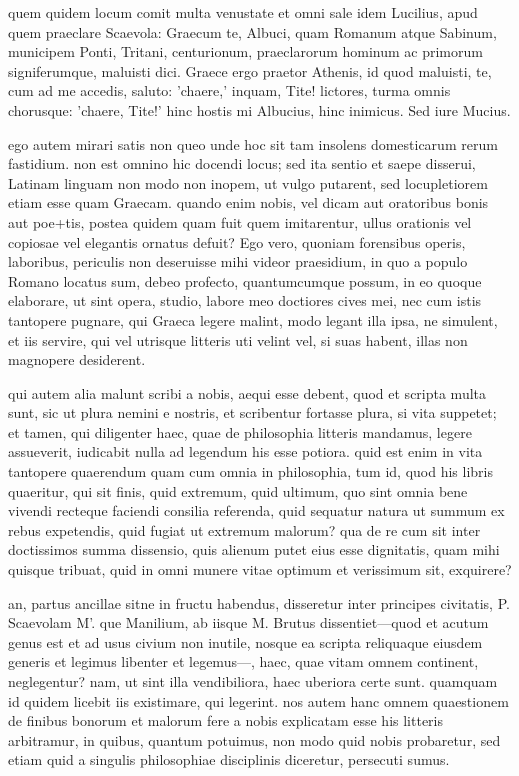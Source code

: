  quem quidem locum comit multa venustate et omni sale idem Lucilius, apud quem praeclare Scaevola: Graecum te, Albuci, quam Romanum atque Sabinum, municipem Ponti, Tritani, centurionum, praeclarorum hominum ac primorum signiferumque, maluisti dici. Graece ergo praetor Athenis, id quod maluisti, te, cum ad me accedis, saluto: 'chaere,' inquam, Tite! lictores, turma omnis chorusque: 'chaere, Tite!' hinc hostis mi Albucius, hinc inimicus. Sed iure Mucius.

 ego autem mirari satis non queo unde hoc sit tam insolens domesticarum rerum fastidium. non est omnino hic docendi locus; sed ita sentio et saepe disserui, Latinam linguam non modo non inopem, ut vulgo putarent, sed locupletiorem etiam esse quam Graecam. quando enim nobis, vel dicam aut oratoribus bonis aut poe+tis, postea quidem quam fuit quem imitarentur, ullus orationis vel copiosae vel elegantis ornatus defuit? Ego vero, quoniam forensibus operis, laboribus, periculis non deseruisse mihi videor praesidium, in quo a populo Romano locatus sum, debeo profecto, quantumcumque possum, in eo quoque elaborare, ut sint opera, studio, labore meo doctiores cives mei, nec cum istis tantopere pugnare, qui Graeca legere malint, modo legant illa ipsa, ne simulent, et iis servire, qui vel utrisque litteris uti velint vel, si suas habent, illas non magnopere desiderent.

 qui autem alia malunt scribi a nobis, aequi esse debent, quod et scripta multa sunt, sic ut plura nemini e nostris, et scribentur fortasse plura, si vita suppetet; et tamen, qui diligenter haec, quae de philosophia litteris mandamus, legere assueverit, iudicabit nulla ad legendum his esse potiora. quid est enim in vita tantopere quaerendum quam cum omnia in philosophia, tum id, quod his libris quaeritur, qui sit finis, quid extremum, quid ultimum, quo sint omnia bene vivendi recteque faciendi consilia referenda, quid sequatur natura ut summum ex rebus expetendis, quid fugiat ut extremum malorum? qua de re cum sit inter doctissimos summa dissensio, quis alienum putet eius esse dignitatis, quam mihi quisque tribuat, quid in omni munere vitae optimum et verissimum sit, exquirere?

 an, partus ancillae sitne in fructu habendus, disseretur inter principes civitatis, P. Scaevolam M'. que Manilium, ab iisque M. Brutus dissentiet—quod et acutum genus est et ad usus civium non inutile, nosque ea scripta reliquaque eiusdem generis et legimus libenter et legemus—, haec, quae vitam omnem continent, neglegentur? nam, ut sint illa vendibiliora, haec uberiora certe sunt. quamquam id quidem licebit iis existimare, qui legerint. nos autem hanc omnem quaestionem de finibus bonorum et malorum fere a nobis explicatam esse his litteris arbitramur, in quibus, quantum potuimus, non modo quid nobis probaretur, sed etiam quid a singulis philosophiae disciplinis diceretur, persecuti sumus.

